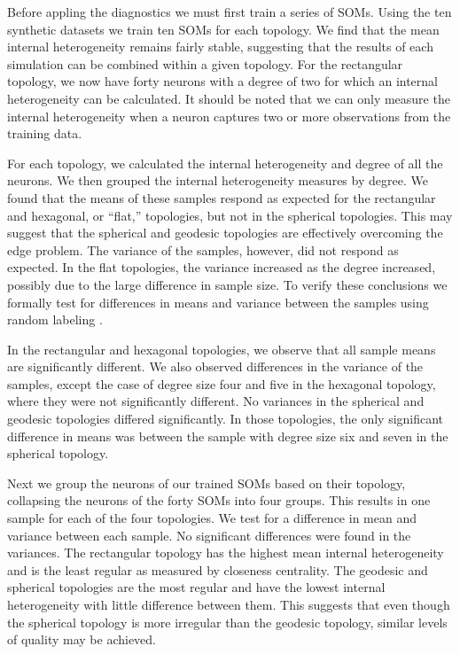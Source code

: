 Before appling the diagnostics we must first train a series of SOMs.  Using the
ten synthetic datasets we train ten SOMs for each topology.  We find that the
mean internal heterogeneity remains fairly stable, suggesting that the results
of each simulation can be combined within a given topology.  For the rectangular
topology, we now have forty neurons with a degree of two for which an internal
heterogeneity can be calculated. It should be noted that we can only measure the
internal heterogeneity when a neuron captures two or more observations from the
training data.

For each topology, we calculated the internal heterogeneity and degree of all
the neurons.  We then grouped the internal heterogeneity measures by degree.  We
found that the means of these samples respond as expected for the rectangular
and hexagonal, or ``flat,''  topologies, but not in the spherical topologies.
This may suggest that the spherical and geodesic topologies are effectively
overcoming the edge problem.  The variance of the samples, however, did not
respond as expected.  In the flat topologies, the variance increased as the
degree increased, possibly due to the large difference in sample size.  To
verify these conclusions we formally test for differences in means and variance
between the samples using random labeling \cite{siss2004}.

In the rectangular and hexagonal topologies, we observe that all sample means
are significantly different.  We also observed differences in the variance of
the samples, except the case of degree size four and five in the hexagonal
topology, where they were not significantly different. No variances in the
spherical and geodesic topologies differed significantly.  In those topologies,
the only significant difference in means was between the sample with degree size
six and seven in the spherical topology.

Next we group the neurons of our trained SOMs based on their topology,
collapsing the neurons of the forty SOMs into four groups.  This results in one
sample for each of the four topologies.  We test for a difference in mean and
variance between each sample. No significant differences were found in the
variances.  The rectangular topology has the highest mean internal heterogeneity
and is the least regular as measured by closeness centrality. The geodesic and
spherical topologies are the most regular and have the lowest internal
heterogeneity with little difference between them.  This suggests that even
though the spherical topology is more irregular than the geodesic topology,
similar levels of quality may be achieved. 


